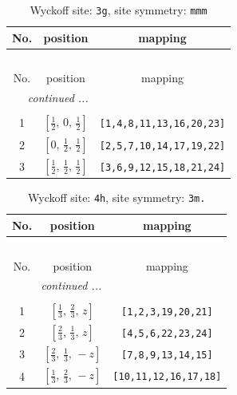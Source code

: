 \documentclass[fleqn,8pt]{jsarticle}
\begin{document}
\begin{longtable}{ccc}
\caption{Wyckoff site: {\tt 3g}, site symmetry: {\tt mmm}}
 \\
 \hline \hline
No. & position & mapping \\ \hline \endfirsthead

\multicolumn{2}{l}{\tablename\ \thetable{}} \\
 \hline \hline
No. & position & mapping \\ \hline \endhead

 \hline \hline
\multicolumn{2}{r}{\footnotesize\it continued ...} \\ \endfoot

 \hline \hline
\multicolumn{2}{r}{} \\ \endlastfoot

1 & $\left[ \frac{1}{2},\, 0,\, \frac{1}{2} \right]$ & {\tt [1,4,8,11,13,16,20,23]} \\ \hline
2 & $\left[ 0,\, \frac{1}{2},\, \frac{1}{2} \right]$ & {\tt [2,5,7,10,14,17,19,22]} \\ \hline
3 & $\left[ \frac{1}{2},\, \frac{1}{2},\, \frac{1}{2} \right]$ & {\tt [3,6,9,12,15,18,21,24]} \\
\end{longtable}
\renewcommand{\arraystretch}{1.2}
\begin{longtable}{ccc}
\caption{Wyckoff site: {\tt 4h}, site symmetry: {\tt 3m.}}
 \\
 \hline \hline
No. & position & mapping \\ \hline \endfirsthead

\multicolumn{2}{l}{\tablename\ \thetable{}} \\
 \hline \hline
No. & position & mapping \\ \hline \endhead

 \hline \hline
\multicolumn{2}{r}{\footnotesize\it continued ...} \\ \endfoot

 \hline \hline
\multicolumn{2}{r}{} \\ \endlastfoot

1 & $\left[ \frac{1}{3},\, \frac{2}{3},\, z \right]$ & {\tt [1,2,3,19,20,21]} \\ \hline
2 & $\left[ \frac{2}{3},\, \frac{1}{3},\, z \right]$ & {\tt [4,5,6,22,23,24]} \\ \hline
3 & $\left[ \frac{2}{3},\, \frac{1}{3},\, - z \right]$ & {\tt [7,8,9,13,14,15]} \\ \hline
4 & $\left[ \frac{1}{3},\, \frac{2}{3},\, - z \right]$ & {\tt [10,11,12,16,17,18]} \\
\end{longtable}
\end{document}
